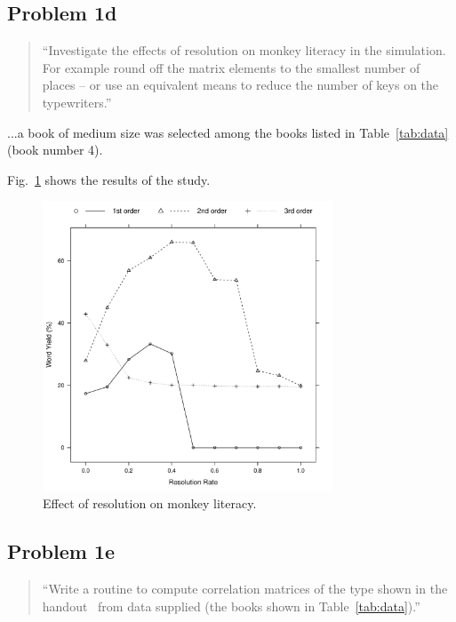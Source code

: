 \documentclass[conference]{IEEEtran}
\newcommand{\codefile}[1]{
  \begin{framed}
  \fontsize{5.65}{6.78}\selectfont
  
  \end{framed}
}
\begin{document}
\subsection{Problem 1d}

\begin{quote}
``Investigate the effects of resolution on monkey literacy in the simulation. 
For example round off the matrix elements to the smallest number of places --
or use an equivalent means to reduce the number of keys on the typewriters.''
\end{quote}

...a book of medium size was selected among the books listed in Table~\ref{tab:data} 
(book number 4).

\codefile{problem1d.py}

Fig.~\ref{fig:problem1d} shows the results of the study.

\begin{figure}[!t]
\centering
\includegraphics[width=3.4in]{problem1d}
\caption{Effect of resolution on monkey literacy.}
\label{fig:problem1d}
\end{figure}


\subsection{Problem 1e}

\begin{quote}
``Write a routine to compute correlation matrices of the type shown in the 
handout~\cite{Bennett1976} from data supplied (the books shown in Table~\ref{tab:data}).''
\end{quote}

\codefile{problem1e.py}
\end{document}
